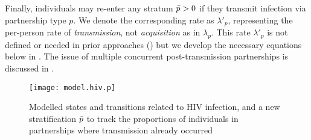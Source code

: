 Finally, individuals may re-enter any stratum $\bar{p} > 0$
if they transmit infection via partnership type $p$.
We denote the corresponding rate as $\lambda'_{p}$,
representing the per-person rate of \emph{transmission},
not \emph{acquisition} as in $\lambda_{p}$.
This rate $\lambda'_{p}$ is not defined or needed in prior approaches ()
but we develop the necessary equations below in .
The issue of multiple concurrent post-transmission partnerships is discussed in .
\begin{figure}
  \centering\texttt{[image: model.hiv.p]}
  \caption{Modelled states and transitions related to HIV infection,
    and a new stratification $\bar{p}$ to track
    the proportions of individuals in partnerships where transmission already occurred}
  \label{fig:model.hiv.p}
\end{figure}
